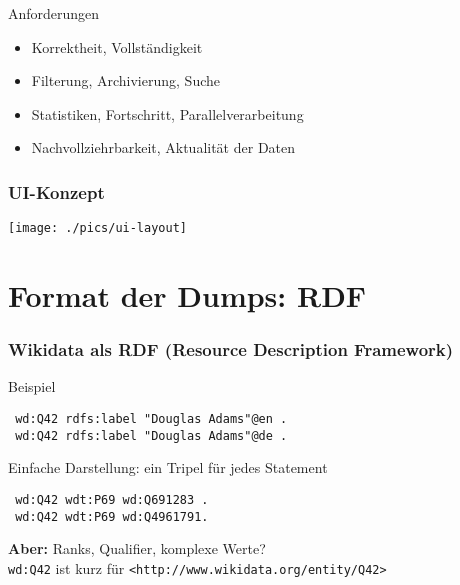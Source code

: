 \documentclass[aspectratio=1609,xcolor=usenames,dvipsnames,svgnames]{beamer}
\begin{document}


\begin{frame}{Anforderungen}
  \begin{itemize}
    \item Korrektheit, Vollständigkeit
    \item Filterung, Archivierung, Suche
    \item Statistiken, Fortschritt, Parallelverarbeitung
    \item Nachvollziehrbarkeit, Aktualität der Daten
  \end{itemize}
\end{frame}

\begin{frame}\frametitle{UI-Konzept}
  \centering
  \texttt{[image: ./pics/ui-layout]}
\end{frame}


\section{Format der Dumps: RDF}

\begin{frame}[t, fragile]\frametitle{Wikidata als RDF (Resource Description Framework)}
  \vspace{0.25cm}

  \begin{block}{Beispiel}
  \begin{verbatim}
 wd:Q42 rdfs:label "Douglas Adams"@en .
 wd:Q42 rdfs:label "Douglas Adams"@de .
  \end{verbatim}
  \end{block}

  \begin{block}{Einfache Darstellung: ein Tripel für jedes Statement}
  \begin{verbatim}
 wd:Q42 wdt:P69 wd:Q691283 .
 wd:Q42 wdt:P69 wd:Q4961791.
  \end{verbatim}
  \end{block}

  \textbf{Aber:} Ranks, Qualifier, komplexe Werte? \\
  \vspace{0.5cm}
  \footnotesize{\verb|wd:Q42| ist kurz für \verb|<http://www.wikidata.org/entity/Q42>|}
\end{frame}
\end{document}

